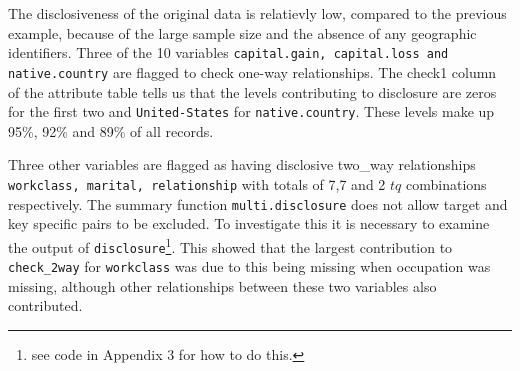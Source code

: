 \documentclass[12pt]{article}
\begin{document}
The disclosiveness of the original data is relatievly low, compared to the previous example, because of the large sample size and the absence of any geographic identifiers. 
Three of the 10 variables \texttt{capital.gain, capital.loss and native.country} are flagged to check one-way relationships. The check1 column of the attribute table tells us that the levels contributing to disclosure are
zeros for the first two and \texttt{United-States} for \texttt{native.country}. These levels make up 95\%, 92\% and 89\% of all records.

Three other variables are flagged as having disclosive two\_way relationships \texttt{workclass, marital, relationship} with totals of 7,7 and 2 $tq$ combinations respectively. The summary function \texttt{multi.disclosure} does not allow target and key specific pairs to be excluded. To
investigate this it is necessary to examine the output of \texttt{disclosure}\footnote{see code in Appendix 3 for how to do this.}. This showed that 
the largest contribution to \texttt{check\_2way} for \texttt{workclass} was due to this being missing when occupation was missing, although other
relationships between these two variables also contributed. 
\end{document}

